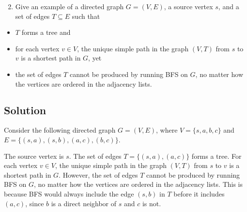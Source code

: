 \documentclass[10pt]{article}
\begin{document}
\begin{enumerate}
  \setcounter{enumi}{1}
  \item Give an example of a directed graph $G=(V, E)$, a source vertex $s$, and a set of edges $T \subseteq E$ such that
\end{enumerate}

\begin{itemize}
  \item $T$ forms a tree and
  \item for each vertex $v \in V$, the unique simple path in the graph $(V, T)$ from $s$ to $v$ is a shortest path in $G$, yet
  \item the set of edges $T$ cannot be produced by running BFS on $G$, no matter how the vertices are ordered in the adjacency lists.
\end{itemize}

\subsection*{Solution}
Consider the following directed graph $G=(V, E)$, where $V = \{s, a, b, c\}$ and $E = \{(s, a), (s, b), (a, c), (b, c)\}$.

\begin{center}
\end{center}

The source vertex is $s$. The set of edges $T = \{(s, a), (a, c)\}$ forms a tree. For each vertex $v \in V$, the unique simple path in the graph $(V, T)$ from $s$ to $v$ is a shortest path in $G$. However, the set of edges $T$ cannot be produced by running BFS on $G$, no matter how the vertices are ordered in the adjacency lists. This is because BFS would always include the edge $(s, b)$ in $T$ before it includes $(a, c)$, since $b$ is a direct neighbor of $s$ and $c$ is not.
\end{document}
